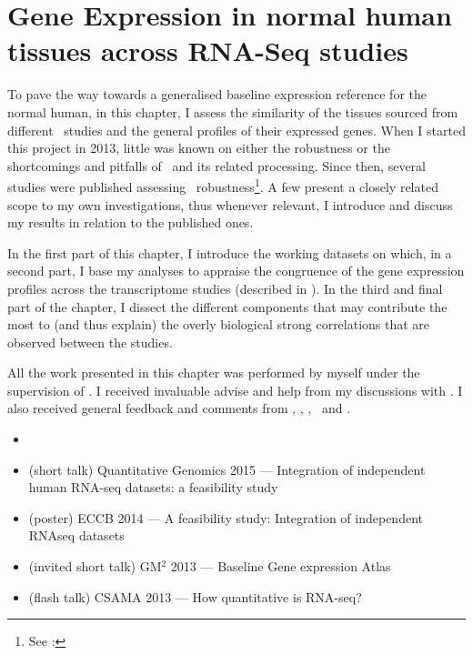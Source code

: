 \chapter{Gene Expression in normal human tissues across RNA-Seq studies}
\label{ch:Transcriptomics}

\vspace*{0.7in}

To pave the way towards
a generalised baseline expression reference for the normal human,
in this chapter, I assess the similarity
of the tissues sourced from different \Rnaseq\ studies and
the general profiles of their expressed genes.
When I started this project in 2013,
little was known on either the robustness or
the shortcomings and pitfalls of \Rnaseq\ and
its related processing.
Since then, several studies were published assessing \Rnaseq\
robustness\footnote{See : }.
A few present a closely related scope to my own investigations, thus
whenever relevant,
I introduce and discuss my results in relation to the published ones.

In the first part of this chapter,
I introduce the working datasets on which,
in a second part,
I base my analyses to appraise the congruence of the gene expression profiles
across the transcriptome studies (described in \Cref{ch:datasets}).
In the third and final part of the chapter,
I dissect the different components that
may contribute the most to (and thus explain)
the overly biological strong correlations that are observed between the studies.

All the work presented in this chapter was performed by myself under the
supervision of \alvis.
I received invaluable advise and help from my discussions with \nuno.
I also received general feedback and comments from \mar, \johan, \sarah, \gos\
and \wolfgang.
\clearpage

\derivativeWork{}
\begin{itemize}[topsep=0pt,nosep]
    \item {}
    \item (short talk) Quantitative Genomics 2015 --- Integration of
        independent human RNA-seq datasets: a feasibility study
    \item (poster) ECCB 2014 --- A feasibility study:
        Integration of independent RNAseq datasets
    \item (invited short talk) GM$^2$ 2013 --- Baseline Gene expression Atlas
    \item (flash talk) CSAMA 2013 --- How quantitative is RNA-seq?
\end{itemize}
\clearpage


